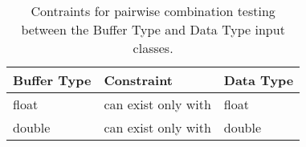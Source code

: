 \begin{table}[ht]

\scriptsize
\centering
\caption{Contraints for pairwise combination testing between the Buffer Type and Data Type input classes.}
\label{table:constraints_3_DAMA}

\begin{tabular}{@{}lll@{}}
\textbf{Buffer   Type} & \textbf{Constraint} & \textbf{Data Type} \\ \midrule
float                  & can exist only with     & float              \\
double                 & can exist only with     & double             \\ \bottomrule
\end{tabular}

\end{table}
